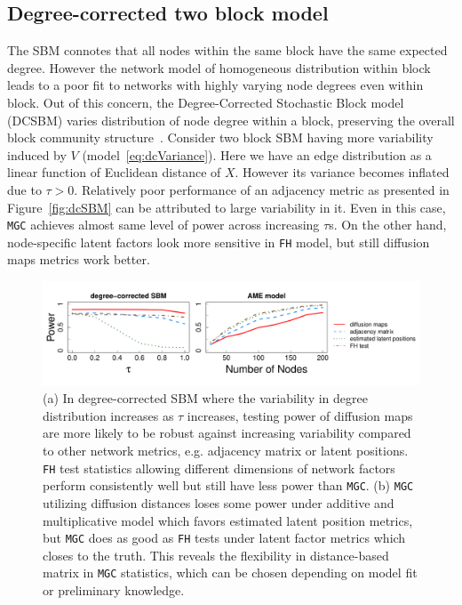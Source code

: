 \documentclass[12pt]{article}
\theoremstyle{definition}
\begin{document}
\subsection{Degree-corrected two block model}

The SBM connotes that all nodes within the same block have the same expected degree. However the network model of homogeneous distribution within block leads to a poor fit to networks with highly varying node degrees even within block. Out of this concern, the Degree-Corrected Stochastic Block model (DCSBM) varies distribution of node degree within a block, preserving the overall block community structure~\citep{karrer2011stochastic}. Consider two block SBM having more variability induced by $V$ (model~\ref{eq:dcVariance}). Here we have an edge distribution as a linear function of Euclidean distance of $X$. However its variance becomes inflated due to $\tau > 0$. Relatively poor performance of an adjacency metric as presented in Figure~\ref{fig:dcSBM} can be attributed to large variability in it. Even in this case, \texttt{MGC} achieves almost same level of power across increasing $\tau$s. On the other hand, node-specific latent factors look more sensitive in \texttt{FH} model, but still diffusion maps metrics work better.

\begin{figure}[H]
	\centering
		\includegraphics[width=\textwidth]{../../Figure/amedc.pdf}
	\caption{(a) In degree-corrected SBM where the variability in degree distribution increases as $\tau$ increases, testing power of diffusion maps are more likely to be robust against increasing variability compared to other network metrics, e.g. adjacency matrix or latent positions. \texttt{FH} test statistics allowing different dimensions of network factors perform consistently well but still have less power than \texttt{MGC}. (b) \texttt{MGC} utilizing diffusion distances loses some power under additive and multiplicative model which favors estimated latent position metrics, but \texttt{MGC} does as good as \texttt{FH} tests under latent factor metrics which closes to the truth. This reveals the flexibility in distance-based matrix in \texttt{MGC} statistics, which can be chosen depending on model fit or preliminary knowledge.}
	\label{fig:combined}
\end{figure}	
	
\end{document}
